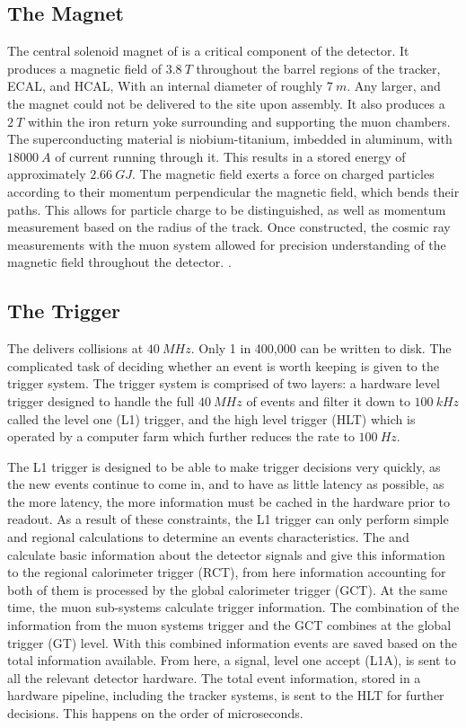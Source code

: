 \subsection{The Magnet}
The central solenoid magnet of \CMS is a critical component of the detector.  It produces a magnetic field of \ensuremath{\SI{3.8}{T}} throughout the barrel regions of the tracker, ECAL, and HCAL, With an internal diameter of roughly \ensuremath{\SI{7}{m}}.  Any larger, and the magnet could not be delivered to the \CMS site upon assembly. It also produces a \ensuremath{\SI{2}{T}} within the iron return yoke surrounding and supporting the muon chambers.  The superconducting material is niobium-titanium, imbedded in aluminum, with \ensuremath{\SI{18000}{A}} of current running through it.  This results in a stored energy of approximately \ensuremath{\SI{2.66}{GJ}}.  The magnetic field exerts a force on charged particles according to their momentum perpendicular the magnetic field, which bends their paths.  This allows for particle charge to be distinguished, as well as momentum measurement based on the radius of the track.  Once constructed, the cosmic ray measurements with the muon system allowed for precision understanding of the magnetic field throughout the detector.  \cite{magnet}.

\subsection{The Trigger}

The \LHC delivers collisions at \ensuremath{\SI{40}{MHz}}.  Only 1 in 400,000 can be written to disk.  The complicated task of deciding whether an event is worth keeping is given to the trigger system.  The \CMS trigger system is comprised of two layers: a hardware level trigger designed to handle the full \ensuremath{\SI{40}{MHz}} of events and filter it down to \ensuremath{\SI{100}{kHz}} called the level one (L1) trigger, and the high level trigger (HLT) which is operated by a computer farm which further reduces the rate to \ensuremath{\SI{100}{Hz}}.

The L1 trigger is designed to be able to make trigger decisions very quickly, as the new events continue to come in, and to have as little latency as possible, as the more latency, the more information must be cached in the hardware prior to readout.  As a result of these constraints, the L1 trigger can only perform simple and regional calculations to determine an events characteristics.  The \ECAL and \HCAL calculate basic information about the detector signals and give this information to the regional calorimeter trigger (RCT), from here information accounting for both of them is processed by the global calorimeter trigger (GCT).  At the same time, the muon sub-systems calculate trigger information.  The combination of the information from the muon systems trigger and the GCT combines at the global trigger (GT) level.  With this combined information events are saved based on the total information available.  From here, a signal, level one accept (L1A), is sent to all the relevant detector hardware. The total event information, stored in a hardware pipeline, including the tracker systems, is sent to the HLT for further decisions.  This happens on the order of microseconds.

